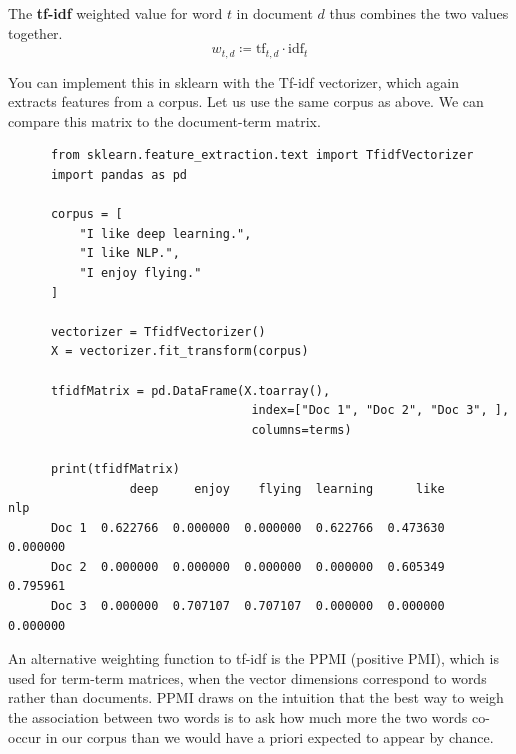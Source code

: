 \documentclass{article}
\begin{document}
    \begin{definition}[tf-idf]
      \label{def:tf-idf}
      The \textbf{tf-idf} weighted value for word $t$ in document $d$ thus combines the two values together. 
      \begin{equation}
        w_{t, d} \coloneqq \mathrm{tf}_{t, d} \cdot \mathrm{idf}_{t}
      \end{equation}
    \end{definition}

    You can implement this in sklearn with the Tf-idf vectorizer, which again extracts features from a corpus. Let us use the same corpus as above. We can compare this matrix to the document-term matrix. 
    \begin{lstlisting}
      from sklearn.feature_extraction.text import TfidfVectorizer
      import pandas as pd

      corpus = [
          "I like deep learning.", 
          "I like NLP.", 
          "I enjoy flying."
      ]

      vectorizer = TfidfVectorizer() 
      X = vectorizer.fit_transform(corpus)

      tfidfMatrix = pd.DataFrame(X.toarray(),
                                  index=["Doc 1", "Doc 2", "Doc 3", ],
                                  columns=terms)

      print(tfidfMatrix)
                 deep     enjoy    flying  learning      like       nlp
      Doc 1  0.622766  0.000000  0.000000  0.622766  0.473630  0.000000
      Doc 2  0.000000  0.000000  0.000000  0.000000  0.605349  0.795961
      Doc 3  0.000000  0.707107  0.707107  0.000000  0.000000  0.000000
    \end{lstlisting}

    An alternative weighting function to tf-idf is the PPMI (positive PMI), which is used for term-term matrices, when the vector dimensions correspond to words rather than documents. PPMI draws on the intuition that the best way to weigh the association between two words is to ask how much more the two words co-occur in our corpus than we would have a priori expected to appear by chance. 
\end{document}
